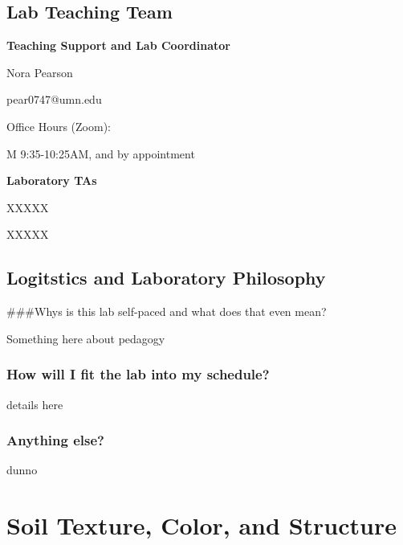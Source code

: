 \documentclass[
  letterpaper,
  DIV=11,
  numbers=noendperiod]{scrreprt}
\begin{document}
\hypertarget{lab-teaching-team}{%
\section*{Lab Teaching Team}\label{lab-teaching-team}}

\textbf{Teaching Support and Lab Coordinator}

Nora Pearson

pear0747@umn.edu

Office Hours (Zoom):

M 9:35-10:25AM, and by appointment

\textbf{Laboratory TAs}

XXXXX

XXXXX

\hypertarget{logitstics-and-laboratory-philosophy}{%
\section*{Logitstics and Laboratory
Philosophy}\label{logitstics-and-laboratory-philosophy}}

\#\#\#Whys is this lab self-paced and what does that even mean?

Something here about pedagogy

\hypertarget{how-will-i-fit-the-lab-into-my-schedule}{%
\subsection*{How will I fit the lab into my
schedule?}\label{how-will-i-fit-the-lab-into-my-schedule}}

details here

\hypertarget{anything-else}{%
\subsection*{Anything else?}\label{anything-else}}

dunno


\hypertarget{soil-texture-color-and-structure}{%
\chapter{\texorpdfstring{\textbf{Soil Texture, Color, and
Structure}}{Soil Texture, Color, and Structure}}\label{soil-texture-color-and-structure}}
\end{document}
